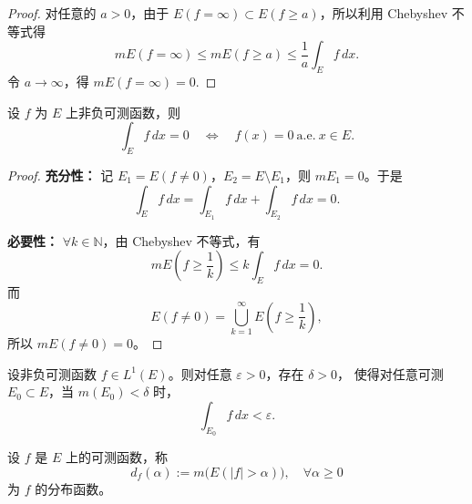 \documentclass[lang=cn,10pt]{elegantbook}
\begin{document}
\begin{proof}
对任意的 $a>0$，由于 $E(f = \infty) \subset E(f \ge a)$，所以利用 Chebyshev 不等式得
\[
mE(f = \infty) \le mE(f \ge a) \le \frac{1}{a} \int_E f \, dx.
\]
令 $a \to \infty$，得 $mE(f = \infty) = 0$.
\end{proof}
\begin{theorem}[非负函数积分为零的条件]
设 $f$ 为 $E$ 上非负可测函数，则
\[
\int_E f\, dx = 0 \quad \Longleftrightarrow \quad f(x) = 0 \ \text{a.e.} \ x \in E.
\]
\end{theorem}

\begin{proof}
\textbf{充分性：} 记 $E_1 = E(f \neq 0)$，$E_2 = E \setminus E_1$，则 $mE_1 = 0$。于是
\[
\int_E f\, dx = \int_{E_1} f\, dx + \int_{E_2} f\, dx = 0.
\]

\textbf{必要性：} $\forall k \in \mathbb{N}$，由 Chebyshev 不等式，有
\[
mE\left( f \ge \frac{1}{k} \right) \le 
k \int_E f\, dx = 0.
\]
而
\[
E(f \neq 0) = \bigcup_{k=1}^\infty E\left( f \ge \frac{1}{k} \right),
\]
所以 $mE(f \neq 0) = 0$。
\end{proof}
\begin{theorem}[积分的绝对连续性]
设非负可测函数 $f\in L^1(E)$。则对任意 $\varepsilon>0$，存在 $\delta>0$，
使得对任意可测 $E_0\subset E$，当 $m(E_0)<\delta$ 时，
\[
\int_{E_0} f\,dx < \varepsilon .
\]
\end{theorem}

\begin{definition}[分布函数]
设 $f$ 是 $E$ 上的可测函数，称
\[
d_f(\alpha) := m\big(E(|f| > \alpha)\big), \quad \forall \alpha \ge 0
\]
为 $f$ 的分布函数。
\end{definition}
\end{document}
